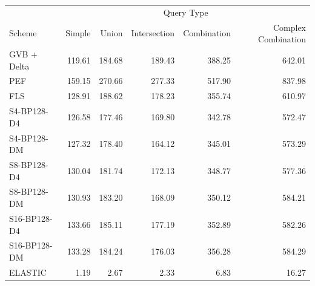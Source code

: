 \begin{tabular}{lrrrrr}
\toprule
 & \multicolumn{5}{c}{Query Type} \\
Scheme & Simple & Union & Intersection & Combination & Complex Combination \\
\midrule
GVB + Delta & 119.61 & 184.68 & 189.43 & 388.25 & 642.01 \\
PEF & 159.15 & 270.66 & 277.33 & 517.90 & 837.98 \\
FLS & 128.91 & 188.62 & 178.23 & 355.74 & 610.97 \\
S4-BP128-D4 & 126.58 & 177.46 & 169.80 & 342.78 & 572.47 \\
S4-BP128-DM & 127.32 & 178.40 & 164.12 & 345.01 & 573.29 \\
S8-BP128-D4 & 130.04 & 181.74 & 172.13 & 348.77 & 577.36 \\
S8-BP128-DM & 130.93 & 183.20 & 168.09 & 350.12 & 584.21 \\
S16-BP128-D4 & 133.66 & 185.11 & 177.19 & 352.89 & 582.26 \\
S16-BP128-DM & 133.28 & 184.24 & 176.03 & 356.28 & 584.29 \\
ELASTIC & 1.19 & 2.67 & 2.33 & 6.83 & 16.27 \\
\bottomrule
\end{tabular}
